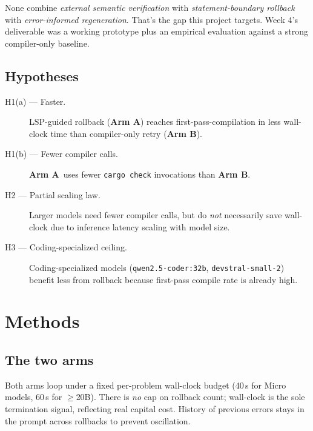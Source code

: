 \documentclass[11pt]{article}
\newcommand{\armA}{\textbf{Arm A}}
\newcommand{\armB}{\textbf{Arm B}}
\begin{document}
None combine \emph{external semantic verification} with \emph{statement-boundary rollback} with \emph{error-informed regeneration}. That's the gap this project targets. Week 4's deliverable was a working prototype plus an empirical evaluation against a strong compiler-only baseline.

\subsection{Hypotheses}

\begin{description}
    \item[H1(a) --- Faster.] LSP-guided rollback (\armA) reaches first-pass-compilation in less wall-clock time than compiler-only retry (\armB).
    \item[H1(b) --- Fewer compiler calls.] \armA\ uses fewer \texttt{cargo check} invocations than \armB.
    \item[H2 --- Partial scaling law.] Larger models need fewer compiler calls, but do \emph{not} necessarily save wall-clock due to inference latency scaling with model size.
    \item[H3 --- Coding-specialized ceiling.] Coding-specialized models (\texttt{qwen2.5-coder:32b}, \texttt{devstral-small-2}) benefit less from rollback because first-pass compile rate is already high.
\end{description}

\section{Methods}
\label{sec:methods}

\subsection{The two arms}

Both arms loop under a fixed per-problem wall-clock budget (40\,s for Micro models, 60\,s for $\geq$20B). There is \emph{no} cap on rollback count; wall-clock is the sole termination signal, reflecting real capital cost. History of previous errors stays in the prompt across rollbacks to prevent oscillation.
\end{document}
